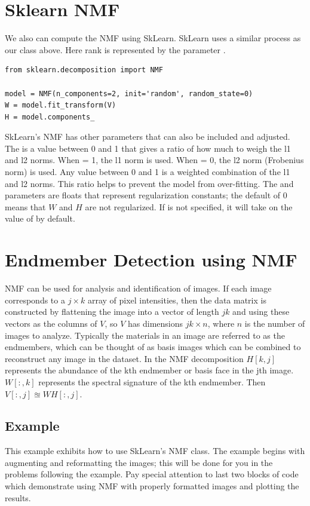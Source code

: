\section*{Sklearn NMF}
We also can compute the NMF using SkLearn.
SkLearn uses a similar process as our class above. 
Here rank is represented by the parameter .
\begin{lstlisting}
from sklearn.decomposition import NMF

model = NMF(n_components=2, init='random', random_state=0)
W = model.fit_transform(V)
H = model.components_
\end{lstlisting}
SkLearn's NMF has other parameters that can also be included and adjusted. The  is a value between 0 and 1 that gives a ratio of how much to weigh the l1 and l2 norms. When  = 1, the l1 norm is used. When  = 0, the l2 norm (Frobenius norm) is used. Any value between 0 and 1 is a weighted combination of the l1 and l2 norms. This ratio helps to prevent the model from over-fitting. The  and  parameters are floats that represent regularization constants; the default of 0 means that $W$ and $H$ are not regularized. If  is not specified, it will take on the value of  by default.

\section*{ Endmember Detection using NMF}
NMF can be used for analysis and identification of images. If each image corresponds to a $j \times k$ array of pixel intensities, then the data matrix is constructed by flattening the image into a vector of length $jk$ and using these vectors as the columns of $V$, so $V$ has dimensions $jk \times n$, where $n$ is the number of images to analyze. 
Typically the materials in an image are referred to as the endmembers, which can be thought of as basis images which can be combined to reconstruct any image in the dataset. 
In the NMF decomposition $H[k ,j]$ represents the abundance of the kth endmember or basis face in the jth image. 
$W[:,k]$ represents the spectral signature of the kth endmember. 
Then $V[:,j] \approxeq W H[:,j]$.

\subsection*{Example}
This example exhibits how to use SkLearn's NMF class. The example begins with augmenting and reformatting the images; this will be done for you in the problems following the example. Pay special attention to last two blocks of code which demonstrate using NMF with properly formatted images and plotting the results. 

